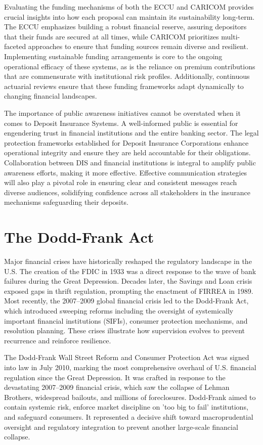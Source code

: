 Evaluating the funding mechanisms of both the ECCU and CARICOM provides crucial insights into how each proposal can maintain its sustainability long-term. The ECCU emphasizes building a robust financial reserve, assuring depositors that their funds are secured at all times, while CARICOM prioritizes multi-faceted approaches to ensure that funding sources remain diverse and resilient. Implementing sustainable funding arrangements is core to the ongoing operational efficacy of these systems, as is the reliance on premium contributions that are commensurate with institutional risk profiles. Additionally, continuous actuarial reviews ensure that these funding frameworks adapt dynamically to changing financial landscapes.

The importance of public awareness initiatives cannot be overstated when it comes to Deposit Insurance Systems. A well-informed public is essential for engendering trust in financial institutions and the entire banking sector. The legal protection frameworks established for Deposit Insurance Corporations enhance operational integrity and ensure they are held accountable for their obligations. Collaboration between DIS and financial institutions is integral to amplify public awareness efforts, making it more effective. Effective communication strategies will also play a pivotal role in ensuring clear and consistent messages reach diverse audiences, solidifying confidence across all stakeholders in the insurance mechanisms safeguarding their deposits.

\section{The Dodd-Frank Act}

Major financial crises have historically reshaped the regulatory landscape in the U.S. The creation of the FDIC in 1933 was a direct response to the wave of bank failures during the Great Depression. Decades later, the Savings and Loan crisis exposed gaps in thrift regulation, prompting the enactment of FIRREA in 1989. Most recently, the 2007–2009 global financial crisis led to the Dodd-Frank Act, which introduced sweeping reforms including the oversight of systemically important financial institutions (SIFIs), consumer protection mechanisms, and resolution planning. These crises illustrate how supervision evolves to prevent recurrence and reinforce resilience.

The Dodd-Frank Wall Street Reform and Consumer Protection Act was signed into law in July 2010, marking the most comprehensive overhaul of U.S. financial regulation since the Great Depression. It was crafted in response to the devastating 2007–2009 financial crisis, which saw the collapse of Lehman Brothers, widespread bailouts, and millions of foreclosures. Dodd-Frank aimed to contain systemic risk, enforce market discipline on 'too big to fail' institutions, and safeguard consumers. It represented a decisive shift toward macroprudential oversight and regulatory integration to prevent another large-scale financial collapse.

